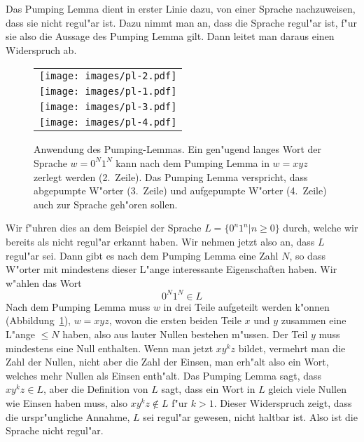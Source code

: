 Das Pumping Lemma dient in erster Linie dazu, von einer Sprache
nachzuweisen, dass sie nicht regul"ar ist. Dazu nimmt man an, dass
die Sprache regul"ar ist, f"ur sie also die Aussage des Pumping Lemma
gilt. Dann leitet man daraus einen Widerspruch ab.

\begin{figure}
\begin{center}
\begin{tabular}{l}
\texttt{[image: images/pl-2.pdf]}\\
\texttt{[image: images/pl-1.pdf]}\\
\texttt{[image: images/pl-3.pdf]}\\
\texttt{[image: images/pl-4.pdf]}
\end{tabular}
\end{center}
\caption{Anwendung des Pumping-Lemmas. Ein gen"ugend langes Wort
der Sprache $w=0^N1^N$ kann nach dem Pumping Lemma in $w=xyz$ 
zerlegt werden (2.~Zeile). Das Pumping Lemma verspricht, dass
abgepumpte W"orter (3.~Zeile) und aufgepumpte W"orter (4.~Zeile)
auch zur Sprache geh"oren sollen.
\label{plimage}}
\end{figure}

\begin{beispiel}
Wir f"uhren dies an dem Beispiel der Sprache $L=\{0^n1^n|n\ge 0\}$
durch, welche wir bereits als nicht regul"ar erkannt haben. Wir nehmen
jetzt also an, dass $L$ regul"ar sei. Dann gibt es nach dem Pumping
Lemma eine Zahl $N$, so dass W"orter mit mindestens dieser L"ange
interessante Eigenschaften haben. Wir w"ahlen das Wort
\[
0^N1^N\in L
\]
Nach dem Pumping Lemma muss $w$ in drei Teile aufgeteilt werden k"onnen
(Abbildung~\ref{plimage}),
$w=xyz$,
wovon die ersten beiden Teile $x$ und $y$ zusammen eine L"ange $\le N$
haben, also aus lauter Nullen bestehen m"ussen. Der Teil $y$ muss
mindestens eine Null enthalten. Wenn man jetzt $xy^kz$ bildet, vermehrt
man die Zahl der Nullen, nicht aber die Zahl der Einsen, man erh"alt
also ein Wort, welches mehr Nullen als Einsen enth"alt. Das Pumping
Lemma sagt, dass $xy^kz\in L$, aber die Definition von $L$ sagt,
dass ein Wort in $L$ gleich viele Nullen wie Einsen haben muss, also
$xy^kz\not\in L$ f"ur $k>1$. Dieser Widerspruch zeigt, dass die urspr"ungliche
Annahme, $L$ sei regul"ar gewesen, nicht haltbar ist. Also ist
die Sprache nicht regul"ar.
\end{beispiel}

